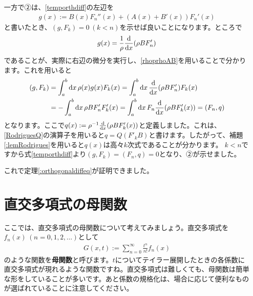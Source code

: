 \documentclass[report,paper=a4, fontsize=12pt, line_length=16cm, number_of_lines=33,dvipdfmx]{jlreq}
\numberwithin{equation}{section}
\newcommand{\strong}[1]{\textsf{\bfseries #1}}
\begin{document}
一方で②は、\eqref{temporthdiff}の左辺を
\begin{align}
  g(x):=B(x)F_n''(x)+(A(x)+B'(x))F_n'(x)
\end{align}
と書いたとき、$(g,F_k)=0 \ (k<n)$を示せば良いことになります。ところで
\begin{align}
  g(x)=\frac{1}{\rho}\dv{x}\qty(\rho B F_n')
\end{align}
であることが、実際に右辺の微分を実行し、\eqref{rhoprhoAB}を用いることで分かります。これを用いると
\begin{align}
  (g,F_k)
  &=\int_{a}^{b}\dd{x}\rho(x) g(x)F_k(x)
  =\int_{a}^{b}\dd{x} \dv{x}\qty(\rho B F_n')F_k(x)\nonumber\\
  &=-\int_{a}^{b}\dd{x} \rho B F_n'F_k'(x)
  =\int_{a}^{b}\dd{x} F_n \dv{x}\qty(\rho B F_k'(x))
  =(F_n,q)\label{temporthdiff2}
\end{align}
となります。ここで$q(x):=\rho^{-1}\dv{x}\qty(\rho B F_k'(x))$と定義しました。これは、\eqref{RodriguesQ}の演算子を用いると$q=Q(F'_k B)$と書けます。したがって、補題\ref{:lemRodrigues}を用いると$q(x)$は高々$k$次式であることが分かります。
$k<n$ですから式\eqref{temporthdiff}より$(g,F_k)=(F_n,q)=0$となり、②が示せました。

これで定理\ref{:orthogonaldiffeq}が証明できました。

\section{直交多項式の母関数}
ここでは、直交多項式の母関数について考えてみましょう。直交多項式を$f_n(x)\ (n=0,1,2,\dots)$として
\begin{align}
  G(x,t):=\sum_{n=0}^{\infty}\frac{t^n}{n!}f_n(x)
\end{align}
のような関数を\strong{母関数}と呼びます。$t$についてテイラー展開したときの各係数に直交多項式が現れるような関数ですね。直交多項式は難しくても、母関数は簡単な形をしていることが多いです。あと係数の規格化は、場合に応じて便利なものが選ばれていることに注意してください。
\end{document}

